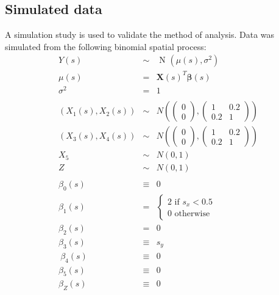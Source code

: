 \documentclass[authoryear ,review]{elsarticle}
\newcommand{\vect}[1]{\boldsymbol{#1}}
\begin{document}
		\subsection{Simulated data}
			 A simulation study is used to validate the method of analysis. Data was simulated from the following binomial spatial process:\\
			\begin{eqnarray*}
				Y(s) &\sim& \text{ N } \left(\mu(s), \sigma^2 \right)\\
				\mu(s) &=& \vect{X}(s)^T \vect{\beta}(s)\\
				\sigma^2 &=& 1\\
				\\
				\left( X_1(s), X_2(s) \right) &\sim& N \left( \left( \begin{array}{c} 0 \\ 0 \end{array} \right), \left( \begin{array}{cc} 1 & 0.2 \\ 0.2 & 1 \end{array} \right) \right)\\
				\left( X_3(s), X_4(s) \right) &\sim& N \left( \left( \begin{array}{c} 0 \\ 0 \end{array} \right), \left( \begin{array}{cc} 1 & 0.2 \\ 0.2 & 1 \end{array} \right) \right)\\
				X_5 &\sim& N \left( 0, 1 \right)\\
				Z &\sim& N \left( 0, 1 \right)\\
				\\
				\beta_0(s) &\equiv& 0\\				
				\beta_1(s) &=& \begin{cases}  2 \text{  if } s_x < 0.5 \\ 0 \text{  otherwise}  \end{cases}\\
				\beta_2(s) &=& 0\\
				\beta_3(s) &\equiv&  s_y\\\
				\beta_4(s) &\equiv& 0\\
				\beta_5(s) &\equiv& 0\\
				\beta_Z(s) &\equiv& 0\\				
			\end{eqnarray*}
			
\end{document}
